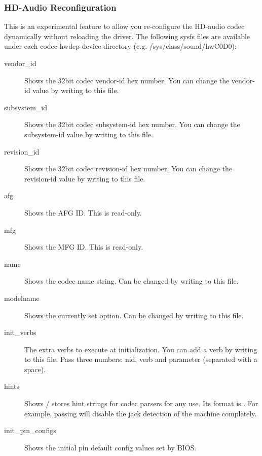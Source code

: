 \documentclass[a4paper,8pt,english]{sphinxmanual}
\begin{document}
\subsubsection{HD-Audio Reconfiguration}
\label{sound/hd-audio/notes:hd-audio-reconfiguration}
This is an experimental feature to allow you re-configure the HD-audio
codec dynamically without reloading the driver.  The following sysfs
files are available under each codec-hwdep device directory (e.g.
/sys/class/sound/hwC0D0):
\begin{description}
\item[{vendor\_id}] \leavevmode
Shows the 32bit codec vendor-id hex number.  You can change the
vendor-id value by writing to this file.

\item[{subsystem\_id}] \leavevmode
Shows the 32bit codec subsystem-id hex number.  You can change the
subsystem-id value by writing to this file.

\item[{revision\_id}] \leavevmode
Shows the 32bit codec revision-id hex number.  You can change the
revision-id value by writing to this file.

\item[{afg}] \leavevmode
Shows the AFG ID.  This is read-only.

\item[{mfg}] \leavevmode
Shows the MFG ID.  This is read-only.

\item[{name}] \leavevmode
Shows the codec name string.  Can be changed by writing to this
file.

\item[{modelname}] \leavevmode
Shows the currently set  option.  Can be changed by writing
to this file.

\item[{init\_verbs}] \leavevmode
The extra verbs to execute at initialization.  You can add a verb by
writing to this file.  Pass three numbers: nid, verb and parameter
(separated with a space).

\item[{hints}] \leavevmode
Shows / stores hint strings for codec parsers for any use.
Its format is .  For example, passing 
will disable the jack detection of the machine completely.

\item[{init\_pin\_configs}] \leavevmode
Shows the initial pin default config values set by BIOS.


\end{description}
\end{document}
